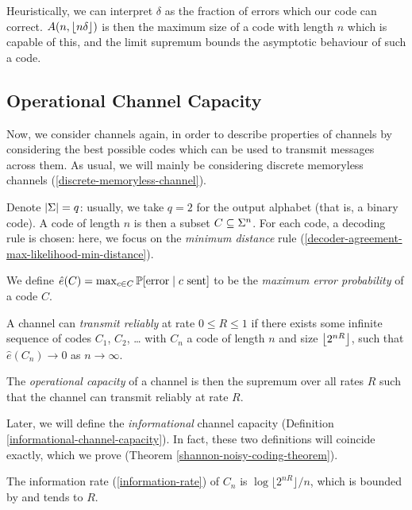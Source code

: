\documentclass{article}
\begin{document}
Heuristically, we can interpret $\delta$
as the fraction of errors which our code can correct.
$A(n, \floor{n\delta})$ is then the maximum size of a code with length $n$
which is capable of this,
and the limit supremum bounds the asymptotic behaviour of such a code.


\subsection{Operational Channel Capacity}

Now, we consider channels again,
in order to describe properties of channels
by considering the best possible codes
which can be used to transmit messages across them.
As usual, we will mainly be considering
discrete memoryless channels (\ref{discrete-memoryless-channel}).

Denote $\abs \Sigma = q$:
usually, we take $q = 2$ for the output alphabet (that is, a binary code).
A code of length $n$ is then a subset $C \subs \Sigma^n$.
For each code, a decoding rule is chosen:
here, we focus on the \textit{minimum distance} rule
(\ref{decoder-agreement-max-likelihood-min-distance}).

\begin{definition}
	\label{operational-channel-capacity}
    We define $\hat e(C) = \max_{c \in C} \P[\text{error} \mid c \text{ sent}]$
    to be the \textit{maximum error probability} of a code $C$.
    
    A channel can \textit{transmit reliably} at rate $0 \leq R \leq 1$
    if there exists some infinite sequence of codes $C_1$, $C_2$, \dots
    with $C_n$ a code of length $n$ and size $\floor{2^{nR}}$,
    such that $\hat e(C_n) \to 0$ as $n \to \infty$.
    
    The \textit{operational capacity} of a channel
    is then the supremum over all rates $R$
    such that the channel can transmit reliably at rate $R$.
\end{definition}

\begin{note}
	Later, we will define the \textit{informational} channel capacity
	(Definition \ref{informational-channel-capacity}).
	In fact, these two definitions will coincide exactly,
	which we prove (Theorem \ref{shannon-noisy-coding-theorem}).
\end{note}

\begin{note}
	The information rate (\ref{information-rate})
	of $C_n$ is $\log \lfloor2^{nR}\rfloor / n$,
	which is bounded by and tends to $R$.
\end{note}
\end{document}
